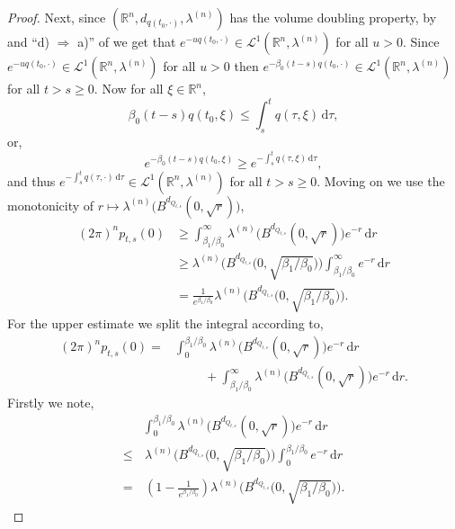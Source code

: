 \documentclass[a4paper, 12pt]{report}
\theoremstyle{remark}
\theoremstyle{definition}
\begin{document}
\begin{proof}
Next, since $(\mathbb{R}^n, d_{q(t_0, \cdot)}, \lambda^{(n)})$ has the volume doubling property, by \cite[Corollary 3.10]{Paper} and ``d) $\Rightarrow$ a)'' of \cite[Proposition 5]{DProofPaper} we get that $e^{-uq(t_0, \cdot)} \in \mathcal{L}^1(\mathbb{R}^n, \lambda^{(n)})$ for all $u > 0$.  Since $e^{-uq(t_0, \cdot)} \in \mathcal{L}^1(\mathbb{R}^n, \lambda^{(n)})$ for all $u > 0$ then $e^{-\beta_0(t - s)q(t_0, \cdot)} \in \mathcal{L}^1(\mathbb{R}^n, \lambda^{(n)})$ for all $t > s \ge 0$.  Now for all $\xi \in \mathbb{R}^n$,
\begin{equation}\label{beta0inequalityproof}
\beta_0(t - s)q(t_0, \xi) \le \int_s^tq(\tau, \xi)\,\mathrm{d}\tau,
\end{equation}
or,
$$
e^{-\beta_0(t - s)q(t_0, \xi)} \ge e^{-\int_s^tq(\tau, \xi)\,\mathrm{d}\tau},
$$
and thus $e^{-\int_s^tq(\tau, \cdot)\,\mathrm{d}\tau} \in \mathcal{L}^1(\mathbb{R}^n, \lambda^{(n)})$ for all $t > s \ge 0$.  Moving on we use the monotonicity of $r \mapsto \lambda^{(n)}\big(B^{d_{Q_{t, s}}}(0, \sqrt{r})\big)$,
\begin{align}
(2\pi)^np_{t, s}(0) & \ge \int_{\beta_1/\beta_0}^\infty\lambda^{(n)}\big(B^{d_{Q_{t, s}}}(0, \sqrt{r})\big)e^{-r}\,\mathrm{d}r\nonumber\\
& \ge \lambda^{(n)}\Big(B^{d_{Q_{t, s}}}\big(0, \sqrt{\beta_1/\beta_0}\big)\Big)\int_{\beta_1/\beta_0}^\infty e^{-r}\,\mathrm{d}r\nonumber\\
& = \frac{1}{e^{\beta_1/\beta_0}}\lambda^{(n)}\Big(B^{d_{Q_{t, s}}}\big(0, \sqrt{\beta_1/\beta_0}\big)\Big).\nonumber
\end{align}
For the upper estimate we split the integral according to,
$$
\begin{aligned}
(2\pi)^np_{t, s}(0) = & \int_0^{\beta_1/\beta_0}\lambda^{(n)}\big(B^{d_{Q_{t, s}}}(0, \sqrt{r})\big)e^{-r}\,\mathrm{d}r\\
& \hspace{1cm} + \int_{\beta_1/\beta_0}^\infty\lambda^{(n)}\big(B^{d_{Q_{t, s}}}(0, \sqrt{r})\big)e^{-r}\,\mathrm{d}r.
\end{aligned}
$$
Firstly we note,
$$
\begin{aligned}
& \int_0^{\beta_1/\beta_0}\lambda^{(n)}\big(B^{d_{Q_{t, s}}}(0, \sqrt{r})\big)e^{-r}\,\mathrm{d}r\\
\le & \, \lambda^{(n)}\Big(B^{d_{Q_{t, s}}}\big(0, \sqrt{\beta_1/\beta_0}\big)\Big)\int_0^{\beta_1/\beta_0}e^{-r}\,\mathrm{d}r\\
= & \, \left(1 - \frac{1}{e^{\beta_1/\beta_0}}\right)\lambda^{(n)}\Big(B^{d_{Q_{t, s}}}\big(0, \sqrt{\beta_1/\beta_0}\big)\Big).

\end{aligned}$$
\end{proof}
\end{document}
